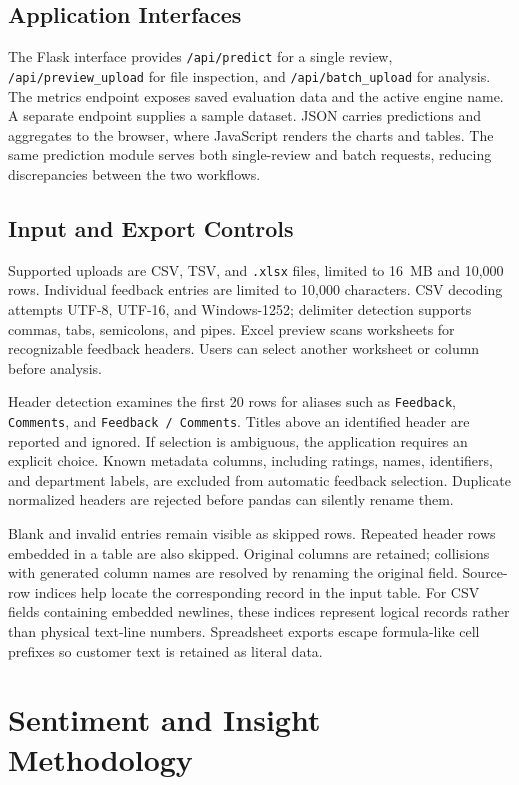 \documentclass[conference,a4paper]{IEEEtran}
\begin{document}
\subsection{Application Interfaces}
The Flask interface provides \texttt{/api/predict} for a single review, \texttt{/api/preview\_upload} for file inspection, and \texttt{/api/batch\_upload} for analysis. The metrics endpoint exposes saved evaluation data and the active engine name. A separate endpoint supplies a sample dataset. JSON carries predictions and aggregates to the browser, where JavaScript renders the charts and tables. The same prediction module serves both single-review and batch requests, reducing discrepancies between the two workflows.

\subsection{Input and Export Controls}
Supported uploads are CSV, TSV, and \texttt{.xlsx} files, limited to 16~MB and 10,000 rows. Individual feedback entries are limited to 10,000 characters. CSV decoding attempts UTF-8, UTF-16, and Windows-1252; delimiter detection supports commas, tabs, semicolons, and pipes. Excel preview scans worksheets for recognizable feedback headers. Users can select another worksheet or column before analysis.

Header detection examines the first 20 rows for aliases such as \texttt{Feedback}, \texttt{Comments}, and \texttt{Feedback / Comments}. Titles above an identified header are reported and ignored. If selection is ambiguous, the application requires an explicit choice. Known metadata columns, including ratings, names, identifiers, and department labels, are excluded from automatic feedback selection. Duplicate normalized headers are rejected before pandas can silently rename them.

Blank and invalid entries remain visible as skipped rows. Repeated header rows embedded in a table are also skipped. Original columns are retained; collisions with generated column names are resolved by renaming the original field. Source-row indices help locate the corresponding record in the input table. For CSV fields containing embedded newlines, these indices represent logical records rather than physical text-line numbers. Spreadsheet exports escape formula-like cell prefixes so customer text is retained as literal data.

\section{Sentiment and Insight Methodology}
\end{document}
